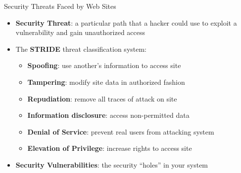 \documentclass[14pt,aspectratio=169]{beamer}
\begin{document}
%
\begin{frame}{Security Threats Faced by Web Sites}
  \begin{itemize}
    \item {\bf Security Threat}: a particular path that a hacker could use to
      exploit a vulnerability and gain unauthorized access
      \vspace*{-.15in}
    \item The {\bf STRIDE} threat classification system:
      \begin{itemize}
        \item {\bf Spoofing}: use another's information to access site
        \item {\bf Tampering}: modify site data in authorized fashion
        \item {\bf Repudiation}: remove all traces of attack on site
        \item {\bf Information disclosure}: access non-permitted data
        \item {\bf Denial of Service}: prevent real users from attacking system
        \item {\bf Elevation of Privilege}: increase rights to access site
      \end{itemize}
      \vspace*{-.25in}
    \item {\bf Security Vulnerabilities}: the security ``holes'' in your system
  \end{itemize}
\end{frame}
\end{document}
